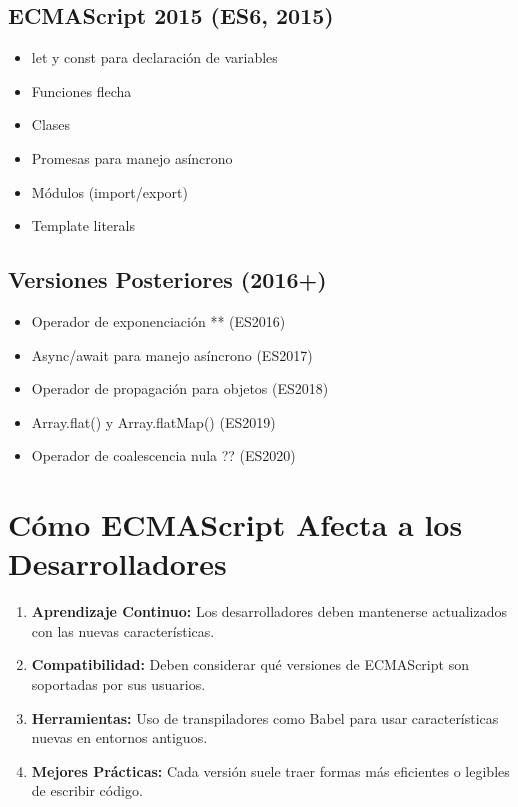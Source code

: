 \documentclass{book}
\begin{document}
\subsection{ECMAScript 2015 (ES6, 2015)}
\begin{itemize}
    \item let y const para declaración de variables
    \item Funciones flecha
    \item Clases
    \item Promesas para manejo asíncrono
    \item Módulos (import/export)
    \item Template literals
\end{itemize}

\subsection{Versiones Posteriores (2016+)}
\begin{itemize}
    \item Operador de exponenciación ** (ES2016)
    \item Async/await para manejo asíncrono (ES2017)
    \item Operador de propagación para objetos (ES2018)
    \item Array.flat() y Array.flatMap() (ES2019)
    \item Operador de coalescencia nula ?? (ES2020)
\end{itemize}

\section{Cómo ECMAScript Afecta a los Desarrolladores}

\begin{enumerate}
    \item \textbf{Aprendizaje Continuo:} Los desarrolladores deben mantenerse actualizados con las nuevas características.
    \item \textbf{Compatibilidad:} Deben considerar qué versiones de ECMAScript son soportadas por sus usuarios.
    \item \textbf{Herramientas:} Uso de transpiladores como Babel para usar características nuevas en entornos antiguos.
    \item \textbf{Mejores Prácticas:} Cada versión suele traer formas más eficientes o legibles de escribir código.
\end{enumerate}
\end{document}
